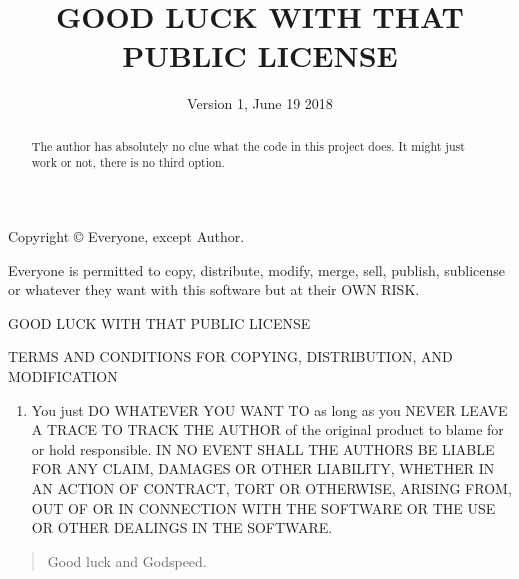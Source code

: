 \documentclass{article}
\date{Version 1, June 19 2018}
\title{GOOD LUCK WITH THAT PUBLIC LICENSE}
\begin{document}
\maketitle
Copyright \copyright\text{ }  Everyone, except Author.

\begin{center}
Everyone is permitted to copy, distribute, modify, merge, sell, publish,
sublicense or whatever they want with this software but at their OWN RISK.
\end{center}

\bigskip

\renewcommand{\abstractname}{Preamble}
\begin{abstract}
 The author has absolutely no clue what the code in this project does.
It might just work or not, there is no third option.
\end{abstract}

\bigskip

\begin{center}
GOOD LUCK WITH THAT PUBLIC LICENSE

TERMS AND CONDITIONS FOR COPYING, DISTRIBUTION, AND MODIFICATION
\end{center}

\begin{enumerate}
\item You just DO WHATEVER YOU WANT TO as long as you NEVER LEAVE A TRACE TO TRACK
THE AUTHOR of the original product to blame for or hold responsible. \newline
\newline IN NO EVENT SHALL THE AUTHORS BE LIABLE FOR ANY CLAIM, DAMAGES OR
OTHER LIABILITY, WHETHER IN AN ACTION OF CONTRACT, TORT OR OTHERWISE, ARISING
FROM, OUT OF OR IN CONNECTION WITH THE SOFTWARE OR THE USE OR OTHER DEALINGS
IN THE SOFTWARE.
\end{enumerate}
\bigskip
\begin{quote}
Good luck and Godspeed.
\end{quote}
\end{document}
